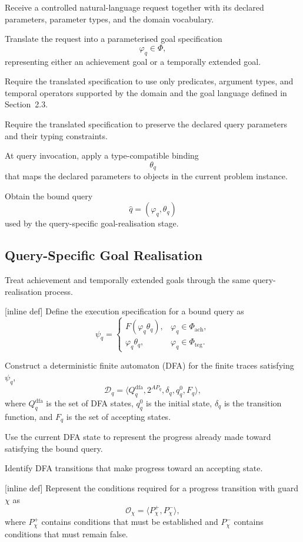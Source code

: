 Receive a controlled natural-language request together with its declared
parameters, parameter types, and the domain vocabulary.

Translate the request into a parameterised goal specification
\[
\varphi_q\in\Phi,
\]
representing either an achievement goal or a temporally extended goal.

Require the translated specification to use only predicates, argument
types, and temporal operators supported by the domain and the goal
language defined in Section~2.3.

Require the translated specification to preserve the declared query
parameters and their typing constraints.


At query invocation, apply a type-compatible binding
\[
\theta_q
\]
that maps the declared parameters to objects in the current problem
instance.

Obtain the bound query
\[
\widehat{q}=(\varphi_q,\theta_q)
\]
used by the query-specific goal-realisation stage.

\subsection{Query-Specific Goal Realisation}

Treat achievement and temporally extended goals through the same
query-realisation process.

[inline def] Define the execution specification for a bound query as
\[
\psi_q
=
\begin{cases}
F(\varphi_q\theta_q),
&
\varphi_q\in\Phi_{\mathrm{ach}},\\[2mm]
\varphi_q\theta_q,
&
\varphi_q\in\Phi_{\mathrm{teg}}.
\end{cases}
\]

Construct a deterministic finite automaton (DFA) for the finite traces
satisfying \(\psi_q\),
\[
\mathcal{D}_q
=
\langle
Q_q^{\mathrm{dfa}},
2^{AP_q},
\delta_q,
q_q^0,
F_q
\rangle,
\]
where \(Q_q^{\mathrm{dfa}}\) is the set of DFA states,
\(q_q^0\) is the initial state,
\(\delta_q\) is the transition function, and
\(F_q\) is the set of accepting states.

Use the current DFA state to represent the progress already made toward
satisfying the bound query.

Identify DFA transitions that make progress toward an accepting state.

[inline def] Represent the conditions required for a progress transition
with guard \(\chi\) as
\[
\mathcal{O}_{\chi}
=
\langle P_{\chi}^{+},P_{\chi}^{-}\rangle,
\]
where \(P_{\chi}^{+}\) contains conditions that must be established and
\(P_{\chi}^{-}\) contains conditions that must remain false.

